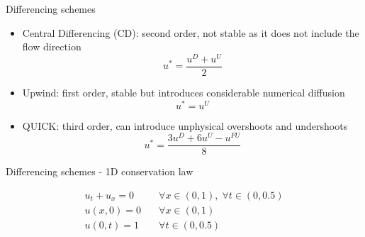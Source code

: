 \documentclass{beamer}
\begin{document}
\begin{frame}{Differencing schemes}
\begin{itemize}
	\item Central Differencing (CD): second order, not stable as it does not 
	include the flow direction
	\begin{equation*}
	u^* = \frac{u^D + u^U}{2}
	\end{equation*}
	\item Upwind: first order, stable but introduces considerable numerical 
	diffusion
	\begin{equation*}
		u^* = u^U
	\end{equation*}
	\item QUICK: third order, can introduce unphysical overshoots and 
	undershoots
	\begin{equation*}
		u^* = \frac{3u^D + 6u^U - u^{FU}}{8}
	\end{equation*}
\end{itemize}
\end{frame}
\begin{frame}{Differencing schemes - 1D conservation law}
\vspace{-0.5cm}
	\begin{align*}
		u_t + u_x = 0 \quad &\forall x \in (0, 1), \; \forall t \in (0, 0.5)\\
		u(x, 0) = 0 \quad &\forall x \in (0, 1)\\
		u(0, t) = 1 \quad &\forall t \in (0, 0.5)
	\end{align*}
	\vspace{-1cm}
	\begin{figure}
		\centering
		
	\end{figure}
\end{frame}
\end{document}
